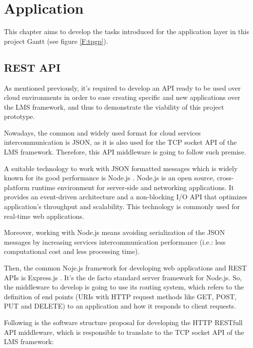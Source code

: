 \chapter{Application}\label{D:application}

This chapter aims to develop the tasks introduced for the application layer in this project Gantt (see figure \ref{F:tpgp}).

\section{REST API}

As mentioned previously, it's required to develop an API ready to be used over cloud environments in order to ease creating specific and new applications over the LMS framework, and thus to demonstrate the viability of this project prototype.

Nowadays, the common and widely used format for cloud services intercommunication is JSON, as it is also used for the TCP socket API of the LMS framework. Therefore, this API middleware is going to follow such premise.

A suitable technology to work with JSON formatted messages which is widely known for its good performance is Node.js \cite{nodejs}. Node.js is an open source, cross-platform runtime environment for server-side and networking applications. It provides an event-driven architecture and a non-blocking I/O API that optimizes application's throughput and scalability. This technology is commonly used for real-time web applications. 

Moreover, working with Node.js means avoiding serialization of the JSON messages by increasing services intercommunication performance (i.e.: less computational cost and less processing time). 

Then, the common Noje.js framework for developing web applications and REST APIs is Express.js \cite{expressjs}. It's the de facto standard server framework for Node.js. So, the middleware to develop is going to use its routing system, which refers to the definition of end points (URIs with HTTP request methods like GET, POST, PUT and DELETE) to an application and how it responds to client requests.

Following is the software structure proposal for developing the HTTP RESTfull API middleware, which is responsible to translate to the TCP socket API of the LMS framework:

